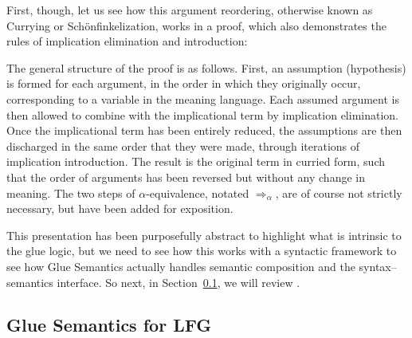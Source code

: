 First, though, let us see how this argument reordering, otherwise
known as Currying or Schönfinkelization, works in a
proof, which also demonstrates the rules of implication elimination
and introduction:
%
\begin{exe}
  \ex \label{ex:semantics-3}
\end{exe}

\largerpage
\noindent
The general structure of the proof is as follows. First, an assumption (hypothesis)
 is formed for each argument, in the order in which they
originally occur, corresponding to a variable in the meaning
language. Each assumed argument is then allowed to combine with the
implicational term by implication elimination. Once the implicational
term has been entirely reduced, the assumptions are then discharged in
the same order that they were made, through iterations of implication
introduction. The result is the original term in curried form, such
that the order of arguments has been reversed but without any change
in meaning. The two steps of $\alpha$-equivalence, notated
$\Rightarrow_\alpha$, are of course  not strictly
necessary, but have been added for exposition. 

This presentation has been purposefully abstract to highlight what is
intrinsic to the glue logic, but we  need to see how this
 works with a syntactic framework to see how Glue Semantics
actually handles semantic composition and the syntax--semantics interface. So next, in
Section~\ref{sec:glue-lfg}, we will review \lfgglue.

\subsection{Glue Semantics for LFG}
\label{sec:glue-lfg}

